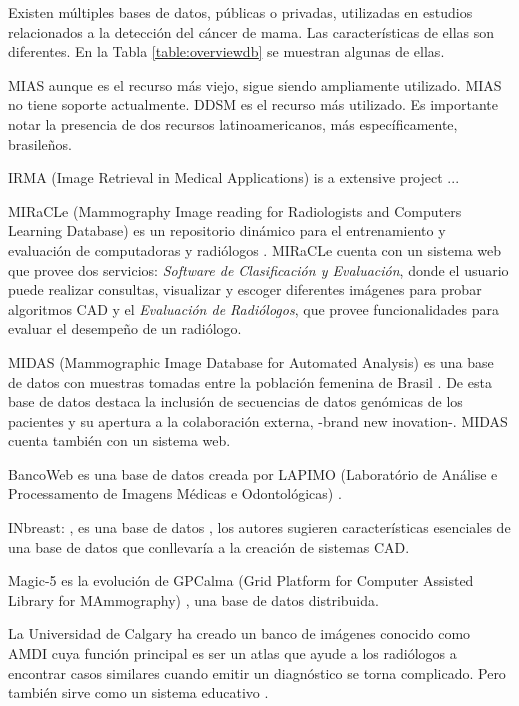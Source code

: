 Existen múltiples bases de datos, públicas o privadas, utilizadas en estudios
relacionados a la detección del cáncer de mama. Las características de ellas
son diferentes. En la Tabla \ref{table:overviewdb} se muestran algunas de ellas.

MIAS \cite{sucklingmini} aunque es el recurso más viejo, sigue siendo
ampliamente utilizado. MIAS no tiene soporte actualmente. DDSM
\cite{heath2000digital} es el recurso más utilizado. Es importante notar la
presencia de dos recursos latinoamericanos, más específicamente, brasileños.

IRMA (Image Retrieval in Medical Applications) is a extensive project
\cite{doi:10.1117/12.770325} ...

MIRaCLe (Mammography Image reading for Radiologists and Computers Learning
Database) es un repositorio dinámico para el entrenamiento y evaluación de
computadoras y radiólogos \cite{antoniou2009web}. MIRaCLe cuenta con un sistema
web que provee dos servicios: \textit{Software de Clasificación y Evaluación},
donde el usuario puede realizar consultas, visualizar y escoger diferentes
imágenes para probar algoritmos CAD y el \textit{Evaluación de Radiólogos}, que
provee funcionalidades para evaluar el desempeño de un radiólogo.

MIDAS (Mammographic Image Database for Automated Analysis) es una base de datos
con muestras tomadas entre la población femenina de Brasil
\cite{fernandes2012midas}. De esta base de datos destaca la inclusión de
secuencias de datos genómicas de los pacientes y su apertura a la colaboración
externa, -brand new inovation-. MIDAS cuenta también con un sistema web.

BancoWeb es una base de datos creada por LAPIMO (Laboratório de Análise e
Processamento de Imagens Médicas e Odontológicas) \cite{matheus2011online}.

INbreast: \cite{moreira2012inbreast}, es una base de datos , los autores
sugieren características esenciales de una base de datos que conllevaría a la
creación de sistemas CAD.

Magic-5 \cite{bellotti2004magic} es la evolución de GPCalma (Grid Platform for
Computer Assisted Library for MAmmography) \cite{lauria2006gpcalma}, una base
de datos distribuida. 

La Universidad de Calgary ha creado un banco de imágenes conocido como AMDI
\cite{suri2006recent} cuya función principal es ser un atlas que ayude a los
radiólogos a encontrar casos similares cuando emitir un diagnóstico se torna
complicado. Pero también sirve como un sistema educativo
\cite{guliato2009indiam}.

